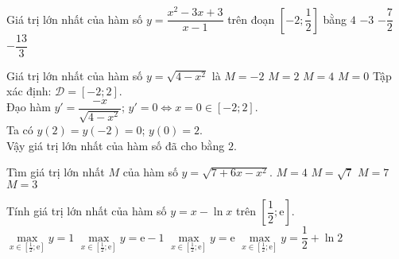 \begin{ex}%
	Giá trị lớn nhất của hàm số $y=\dfrac{x^2-3x+3}{x-1}$ trên đoạn $\left[-2;\dfrac{1}{2}\right]$ bằng
	\choice
	{$4$}
	{\True $-3$}
	{$-\dfrac{7}{2}$}
	{$-\dfrac{13}{3}$}
\end{ex} 

\begin{ex}
	Giá trị lớn nhất của hàm số $y=\sqrt{4-x^2}$ là
	\choice
	{$M=-2$}
	{\True $M=2$ }
	{$M=4$}
	{$M=0$}
	\loigiai
	{
		Tập xác định: $\mathscr{D}=\left[-2;2\right]$.\\
		Đạo hàm $y'=\dfrac{-x}{\sqrt{4-x^{2}}}$; $y'=0 \Leftrightarrow x=0 \in \left[-2;2\right]$.\\
		Ta có $y(2)=y(-2)=0$; $y(0)=2$.\\
		Vậy giá trị lớn nhất của hàm số đã cho bằng $2$.
	}
\end{ex} 

\begin{ex}%
	Tìm giá trị lớn nhất $M$ của hàm số $y=\sqrt{7+6x-x^2}$.
	\choice
	{\True $M=4$}
	{$M=\sqrt{7}$}
	{$M=7$}
	{$M=3$}
\end{ex} 

\begin{ex}%
	Tính giá trị lớn nhất của hàm số $y=x-\ln x$ trên $\left[\dfrac{1}{2};\mathrm{e}\right]$.\\
	\choice
	{$\max\limits_{x \in \left[\frac{1}{2};\mathrm{e}\right]}y=1$}
	{\True $\max\limits_{x \in \left[\frac{1}{2};\mathrm{e}\right]}y=\mathrm{e}-1$}
	{$\max\limits_{x \in \left[\frac{1}{2};\mathrm{e}\right]}y=\mathrm{e}$}
	{$\max\limits_{x \in \left[\frac{1}{2};\mathrm{e}\right]}y=\dfrac{1}{2}+\ln 2$}
\end{ex} 

